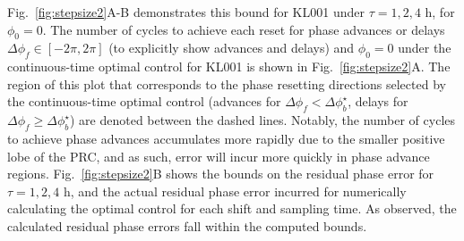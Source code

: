 Fig.~\ref{fig:stepsize2}A-B demonstrates this bound for KL001 under $\tau = 1,2,4$ h, for $\phi_0 = 0$.
The number of cycles to achieve each reset for phase advances or delays $\Delta\phi_f\in[-2\pi,2\pi]$ (to explicitly show advances and delays) and $\phi_0=0$ under the continuous-time optimal control for KL001 is shown in Fig.~\ref{fig:stepsize2}A.
The region of this plot that corresponds to the phase resetting directions selected by the continuous-time optimal control (advances for $\Delta\phi_f < \Delta\phi_b^\star$, delays for $\Delta\phi_f \geq \Delta\phi_b^\star$) are denoted between the dashed lines.
Notably, the number of cycles to achieve phase advances accumulates more rapidly due to the smaller positive lobe of the PRC, and as such, error will incur more quickly in phase advance regions.
Fig.~\ref{fig:stepsize2}B shows the bounds on the residual phase error for $\tau = 1,2,4$ h, and the actual residual phase error incurred for numerically calculating the optimal control for each shift and sampling time.
As observed, the calculated residual phase errors fall within the computed bounds.

